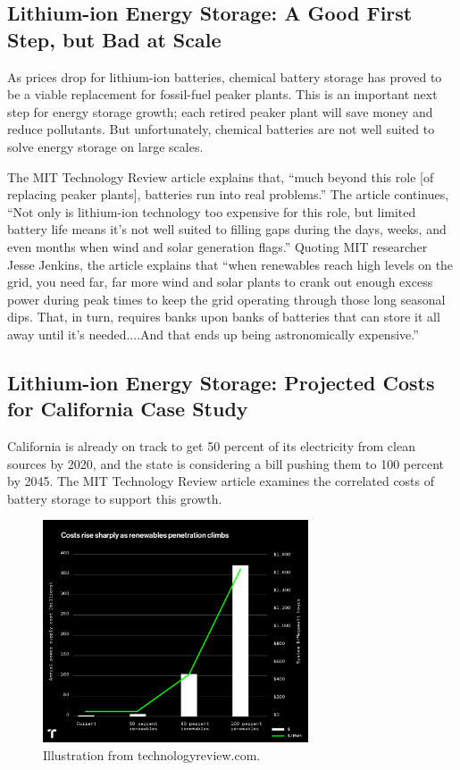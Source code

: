 \documentclass[hidelinks,12pt,a4paper]{article}
\begin{document}
\subsection{Lithium-ion Energy Storage: A Good First Step, but Bad at Scale}
As prices drop for lithium-ion batteries, chemical battery storage has proved to be a viable replacement for fossil-fuel peaker plants. This is an important next step for energy storage growth; each retired peaker plant will save money and reduce pollutants. But unfortunately, chemical batteries are not well suited to solve energy storage on large scales.

The MIT Technology Review article explains that, “much beyond this role [of replacing peaker plants], batteries run into real problems.” \cite{TheTwoPointFiveTrillionReasonWeCantRelyOnBatteries} The article continues, “Not only is lithium-ion technology too expensive for this role, but limited battery life means it’s not well suited to filling gaps during the days, weeks, and even months when wind and solar generation flags.” \cite{TheTwoPointFiveTrillionReasonWeCantRelyOnBatteries} Quoting MIT researcher Jesse Jenkins, the article explains that “when renewables reach high levels on the grid, you need far, far more wind and solar plants to crank out enough excess power during peak times to keep the grid operating through those long seasonal dips. That, in turn, requires banks upon banks of batteries that can store it all away until it’s needed....And that ends up being astronomically expensive.” \cite{TheTwoPointFiveTrillionReasonWeCantRelyOnBatteries}

\subsection{Lithium-ion Energy Storage: Projected Costs for California Case Study}

California is already on track to get 50 percent of its electricity from clean sources by 2020, and the state is considering a bill pushing them to 100 percent by 2045. The MIT Technology Review article examines the correlated costs of battery storage to support this growth.

\begin{figure}[ht!]
    \centering
    \includegraphics[width=0.7\textwidth]{batterystorage-02_0.png}
    \caption{Illustration from technologyreview.com. \cite{TheTwoPointFiveTrillionReasonWeCantRelyOnBatteries}}
\end{figure}
\FloatBarrier
\end{document}

